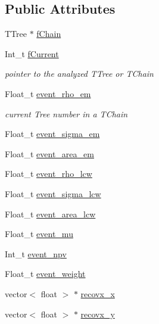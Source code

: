 \subsection*{Public Attributes}
\begin{DoxyCompactItemize}
\item 
T\+Tree $\ast$ \hyperlink{classCollectionTree_ae9a80b9f4004eb8aee0f1945459a28cc}{f\+Chain}
\item 
Int\+\_\+t \hyperlink{classCollectionTree_aa32e77adf00f9724891d858b9a9d6c54}{f\+Current}
\begin{DoxyCompactList}\small\item\em pointer to the analyzed T\+Tree or T\+Chain \end{DoxyCompactList}\item 
Float\+\_\+t \hyperlink{classCollectionTree_afb2cabdaee83bddeb7bcc6ede221c0b3}{event\+\_\+rho\+\_\+em}
\begin{DoxyCompactList}\small\item\em current Tree number in a T\+Chain \end{DoxyCompactList}\item 
Float\+\_\+t \hyperlink{classCollectionTree_af5d4330e3a31562a01a399b1c1f9696c}{event\+\_\+sigma\+\_\+em}
\item 
Float\+\_\+t \hyperlink{classCollectionTree_af86b9d21544b53fb281a205a5878500a}{event\+\_\+area\+\_\+em}
\item 
Float\+\_\+t \hyperlink{classCollectionTree_a00c091e2d9406e1509ed16da7a0af876}{event\+\_\+rho\+\_\+lcw}
\item 
Float\+\_\+t \hyperlink{classCollectionTree_ad5aa175890c277ff8a104e448cbd13d3}{event\+\_\+sigma\+\_\+lcw}
\item 
Float\+\_\+t \hyperlink{classCollectionTree_a6ecbac30e9f29dbcd8e21be1678af0ea}{event\+\_\+area\+\_\+lcw}
\item 
Float\+\_\+t \hyperlink{classCollectionTree_a6c313a3a4d3820ce7dcc68608ad16617}{event\+\_\+mu}
\item 
Int\+\_\+t \hyperlink{classCollectionTree_a02b2abec8215774c647b784d1d36ebf7}{event\+\_\+npv}
\item 
Float\+\_\+t \hyperlink{classCollectionTree_a815621f4df78971f585b0e230553c043}{event\+\_\+weight}
\item 
vector$<$ float $>$ $\ast$ \hyperlink{classCollectionTree_a0a59fdc239ff4bb3fffed45048a7349b}{recovx\+\_\+x}
\item 
vector$<$ float $>$ $\ast$ \hyperlink{classCollectionTree_a6aa13ac1e88c6c363b10f4f0fc54bcc3}{recovx\+\_\+y}

\end{DoxyCompactItemize}
